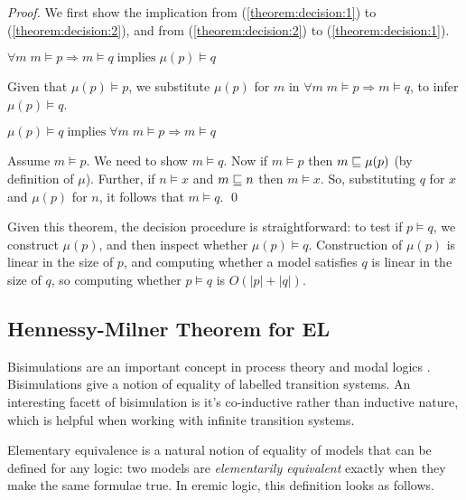 \begin{proof}
We first show the implication from (\ref{theorem:decision:1}) to
(\ref{theorem:decision:2}), and from (\ref{theorem:decision:2}) to
(\ref{theorem:decision:1}).  \setcounter{mycase}{0}
\begin{mycase}
$\forall m \; m \models p \Rightarrow m \models q \; \text{implies} \; \mu(p) \models q$
\end{mycase}

\NI Given that $\mu(p) \models p$, we substitute $\mu(p)$ for $m$ in
$\forall m \; m \models p \Rightarrow m \models q$, to infer $\mu(p)
\models q$.

\begin{mycase}
$\mu(p) \models q \; \text{implies} \; \forall m \; m \models p \Rightarrow m \models q$
\end{mycase}

\NI Assume $m \models p$. We need to show $m \models q$.  Now if $m
\models p$ then $m \sqsubseteq \mu(p)$ (by definition of $\mu$).  Further, if
$n \models x$ and $m \sqsubseteq n$ then $m \models x$. So, substituting $q$
for $x$ and $\mu(p)$ for $n$, it follows that $m \models q$.  \qed
\end{proof}

\NI Given this theorem, the decision procedure is straightforward: to
test if $p \models q$, we construct $\mu(p)$, and then inspect whether
$\mu(p) \models q$.  Construction of $\mu(p)$ is linear in the size of
$p$, and computing whether a model satisfies $q$ is linear in the size
of $q$, so computing whether $p \models q$ is $O(|p|+|q|)$.


\subsection{Hennessy-Milner Theorem for EL}

Bisimulations are an important concept in process theory and modal
logics \cite{SangiorgiD:intbisac}. Bisimulations give a notion of
equality of labelled transition systems. An interesting facett of
bisimulation is it's co-inductive rather than inductive nature, which
is helpful when working with infinite transition systems.

Elementary equivalence is a natural notion of equality of models that
can be defined for any logic: two models are \emph{elementarily
  equivalent} exactly when they make the same formulae true. In eremic
logic, this definition looks as follows.

